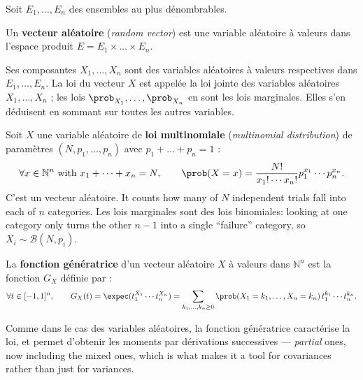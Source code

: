 Soit $E_{1}, \dots, E_{n}$ des ensembles au plus dénombrables.

\begin{definition}
  Un \textbf{vecteur aléatoire} (\textit{random vector}) est une variable
  aléatoire à valeurs dans l'espace produit $E = E_{1} \times \dots \times E_{n}$.
\end{definition}

Ses composantes $X_{1}, \dots, X_{n}$ sont des variables aléatoires à valeurs
respectives dans $E_{1}, \dots, E_{n}$. La loi du vecteur $X$ est appelée la loi
jointe des variables aléatoires $X_{1}, \dots, X_{n}$ ; les lois
$\prob_{X_{1}}, \dots, \prob_{X_{n}}$ en sont les lois marginales. Elles s'en
déduisent en sommant sur toutes les autres variables.

\begin{example}
  Soit $X$ une variable aléatoire de \textbf{loi multinomiale}
  (\textit{multinomial distribution}) de paramètres $(N, p_{1}, \dots, p_{n})$
  avec $p_{1} + \dots + p_{n} = 1$ :
  \[ \forall x \in \mathbb{N}^{n} \text{ with } x_{1} + \dots + x_{n} = N,
     \qquad \prob(X = x)
       = \frac{N!}{x_{1}! \cdots x_{n}!} p_{1}^{x_{1}} \cdots p_{n}^{x_{n}}. \]
  C'est un vecteur aléatoire. It counts how many of $N$ independent trials fall
  into each of $n$ categories. Les lois marginales sont des lois binomiales:
  looking at one category only turns the other $n-1$ into a single ``failure''
  category, so $X_{i} \sim \mathcal{B}(N, p_{i})$.
\end{example}

\begin{definition}
  La \textbf{fonction génératrice} d'un vecteur aléatoire $X$ à valeurs dans
  $\mathbb{N}^{n}$ est la fonction $G_{X}$ définie par :
  \[ \forall t \in [-1,1]^{n}, \qquad
     G_{X}(t) = \expec(t_{1}^{X_{1}} \cdots t_{n}^{X_{n}})
       = \sum_{k_{1}, \dots, k_{n} \ge 0}
         \prob(X_{1} = k_{1}, \dots, X_{n} = k_{n})\,
         t_{1}^{k_{1}} \cdots t_{n}^{k_{n}}. \]
\end{definition}

Comme dans le cas des variables aléatoires, la fonction génératrice caractérise
la loi, et permet d'obtenir les moments par dérivations successives ---
\emph{partial} ones, now including the mixed ones, which is what makes it a tool
for covariances rather than just for variances.

